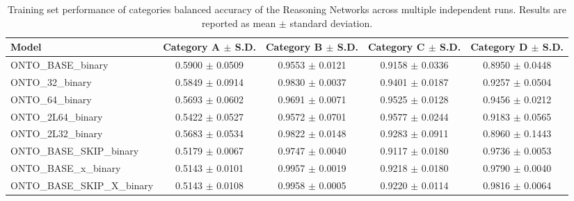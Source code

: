 \begin{table}[t]
\centering
\begin{tabular}{l c c c c}
\toprule
Model & Category A $\pm$ S.D. & Category B $\pm$ S.D. & Category C $\pm$ S.D. & Category D $\pm$ S.D. \\
\midrule
ONTO_BASE_binary & 0.5900 $\pm$ 0.0509 & 0.9553 $\pm$ 0.0121 & 0.9158 $\pm$ 0.0336 & 0.8950 $\pm$ 0.0448 \\
ONTO_32_binary & 0.5849 $\pm$ 0.0914 & 0.9830 $\pm$ 0.0037 & 0.9401 $\pm$ 0.0187 & 0.9257 $\pm$ 0.0504 \\
ONTO_64_binary & 0.5693 $\pm$ 0.0602 & 0.9691 $\pm$ 0.0071 & 0.9525 $\pm$ 0.0128 & 0.9456 $\pm$ 0.0212 \\
ONTO_2L64_binary & 0.5422 $\pm$ 0.0527 & 0.9572 $\pm$ 0.0701 & 0.9577 $\pm$ 0.0244 & 0.9183 $\pm$ 0.0565 \\
ONTO_2L32_binary & 0.5683 $\pm$ 0.0534 & 0.9822 $\pm$ 0.0148 & 0.9283 $\pm$ 0.0911 & 0.8960 $\pm$ 0.1443 \\
ONTO_BASE_SKIP_binary & 0.5179 $\pm$ 0.0067 & 0.9747 $\pm$ 0.0040 & 0.9117 $\pm$ 0.0180 & 0.9736 $\pm$ 0.0053 \\
ONTO_BASE_x_binary & 0.5143 $\pm$ 0.0101 & 0.9957 $\pm$ 0.0019 & 0.9218 $\pm$ 0.0180 & 0.9790 $\pm$ 0.0040 \\
ONTO_BASE_SKIP_X_binary & 0.5143 $\pm$ 0.0108 & 0.9958 $\pm$ 0.0005 & 0.9220 $\pm$ 0.0114 & 0.9816 $\pm$ 0.0064 \\
\bottomrule
\end{tabular}
\caption{Training set performance of categories balanced accuracy of the Reasoning Networks across multiple independent runs. Results are reported as mean $\pm$ standard deviation.}
\label{tab:training_rn_results}
\end{table}